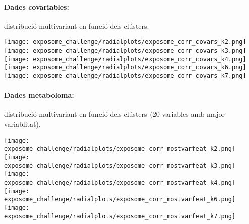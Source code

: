 \documentclass[CAT,BIB]{TFUOC}%
\begin{document}
            \paragraph{Dades covariables:} distribució multivariant en funció dels clústers.

            \begin{center}
                \texttt{[image: exposome\_challenge/radialplots/exposome\_corr\_covars\_k2.png]}
                \texttt{[image: exposome\_challenge/radialplots/exposome\_corr\_covars\_k3.png]}
                \texttt{[image: exposome\_challenge/radialplots/exposome\_corr\_covars\_k4.png]}
                \texttt{[image: exposome\_challenge/radialplots/exposome\_corr\_covars\_k6.png]}
                \texttt{[image: exposome\_challenge/radialplots/exposome\_corr\_covars\_k7.png]}
            \end{center}

            \paragraph{Dades metaboloma:} distribució multivariant en funció dels clústers (20 variables amb major variablitat).

            \begin{center}
                \texttt{[image: exposome\_challenge/radialplots/exposome\_corr\_mostvarfeat\_k2.png]}
                \texttt{[image: exposome\_challenge/radialplots/exposome\_corr\_mostvarfeat\_k3.png]}
                \texttt{[image: exposome\_challenge/radialplots/exposome\_corr\_mostvarfeat\_k4.png]}
                \texttt{[image: exposome\_challenge/radialplots/exposome\_corr\_mostvarfeat\_k6.png]}
                \texttt{[image: exposome\_challenge/radialplots/exposome\_corr\_mostvarfeat\_k7.png]}
            \end{center}
\end{document}
